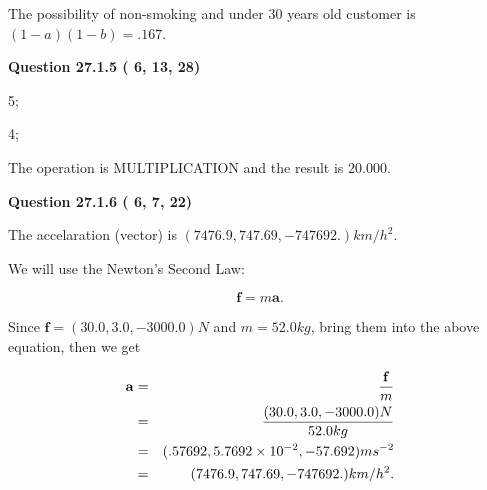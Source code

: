 \documentclass[12pt]{article}
\begin{document}
 
 
\noindent{}

The possibility of  %
 non-smoking and  %
under 30 years old
customer is $ (1-a)(1-b) =  %
.167 $.
 
 
  
\vspace{0.2in}
  
{\textbf{\Large{Question
27.1.5 
 (          6,         13,         28)
}}}
  
  
 
 
\noindent{}

5;
 
4;
 
The operation is  %
MULTIPLICATION and the result is
$ %
20.000$.
 
 
 
  
\vspace{0.2in}
  
{\textbf{\Large{Question
27.1.6 
 (          6,          7,         22)
}}}
  
  
 
 
\noindent{}
 
 
The accelaration (vector) is
$(
7476.9,
747.69 ,
-747692.
)km/h^2.
$
 
 
 
 
 
 
\noindent{}

We will use the Newton's Second Law:
 
\[
\mathbf{f}=m\mathbf{a}.
\]
 
Since $\mathbf{f}=( %
30.0,  %
3.0,  %
-3000.0 )N$
and $m= %
52.0 kg$, bring them into the above equation, then we get
 
\begin{eqnarray*}
\mathbf{a}&=&\frac{\mathbf{f}}m  \\
&=&\frac{(
30.0 ,
3.0 ,
-3000.0 )N
}{ %
52.0 kg}  \\
&=&(
.57692 ,
5.7692 \times 10^{-2},
-57.692
)ms^{-2} \\
&=&(
7476.9 ,
747.69 ,
-747692.
)km/h^2.
\end{eqnarray*}
 
 
 
\end{document}
